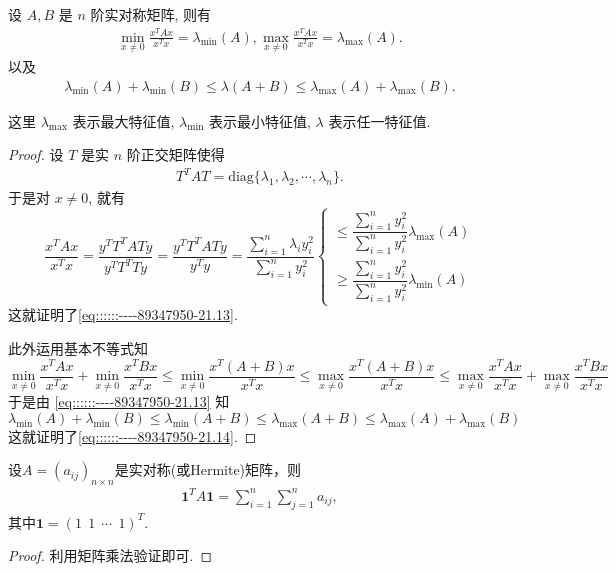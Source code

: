 \documentclass[../../main.tex]{subfiles}
\begin{document}
\begin{proposition}\label{proposition:Rayleigh-quotient瑞丽商的基本性质}
设 \( A, B \) 是 \( n \) 阶实对称矩阵, 则有
\begin{align}
\min_{x \neq 0} \frac{x^T A x}{x^T x} = \lambda_{\min}(A), \max_{x \neq 0} \frac{x^T A x}{x^T x} = \lambda_{\max}(A). \label{eq::::::----89347950-21.13}
\end{align}
以及
\begin{align}
\lambda_{\min}(A) + \lambda_{\min}(B) \leqslant \lambda(A + B) \leqslant \lambda_{\max}(A) + \lambda_{\max}(B). \label{eq::::::----89347950-21.14}
\end{align}
\end{proposition}
\begin{note}
这里 \( \lambda_{\max} \) 表示最大特征值, \( \lambda_{\min} \) 表示最小特征值, \( \lambda \) 表示任一特征值.
\end{note}
\begin{proof}
设 \( T \) 是实 \( n \) 阶正交矩阵使得
\begin{align*}
T^T A T = \text{diag} \{ \lambda_1, \lambda_2, \cdots, \lambda_n \} .
\end{align*}
于是对 \( x \neq 0 \), 就有
\[
\frac{x^T A x}{x^T x} = \frac{y^T T^T A T y}{y^T T^T T y} = \frac{y^T T^T A T y}{y^T y} = \frac{\sum\limits_{i=1}^n \lambda_i y_i^2}{\sum\limits_{i=1}^n y_i^2}
\begin{cases} 
\leqslant \dfrac{\sum\limits_{i=1}^n y_i^2}{\sum\limits_{i=1}^n y_i^2} \lambda_{\max}(A) \\
\geqslant \dfrac{\sum\limits_{i=1}^n y_i^2}{\sum\limits_{i=1}^n y_i^2} \lambda_{\min}(A)
\end{cases}
\]
这就证明了\eqref{eq::::::----89347950-21.13}.

此外运用基本不等式知
\[
\min_{x \neq 0} \frac{x^T A x}{x^T x} + \min_{x \neq 0} \frac{x^T B x}{x^T x} \leqslant \min_{x \neq 0} \frac{x^T (A + B) x}{x^T x} \leqslant \max_{x \neq 0} \frac{x^T (A + B) x}{x^T x} \leqslant \max_{x \neq 0} \frac{x^T A x}{x^T x} + \max_{x \neq 0} \frac{x^T B x}{x^T x}
\]
于是由 \eqref{eq::::::----89347950-21.13} 知
\[
\lambda_{\min}(A) + \lambda_{\min}(B) \leqslant \lambda_{\min}(A + B) \leqslant \lambda_{\max}(A + B) \leqslant \lambda_{\max}(A) + \lambda_{\max}(B)
\]
这就证明了\eqref{eq::::::----89347950-21.14}.
\end{proof}

\begin{proposition}\label{proposition:对称阵所有元素之和就是一个二次型}
设$A=(a_{ij})_{n\times n}$是实对称(或Hermite)矩阵，则
\begin{align*}
\mathbf{1}^T A \mathbf{1} = \sum_{i=1}^n \sum_{j=1}^n a_{ij},
\end{align*}
其中$\mathbf{1}=(1\ \ 1\ \ \cdots\ \ 1)^T$.
\end{proposition}
\begin{proof}
利用矩阵乘法验证即可.
\end{proof}
\end{document}
